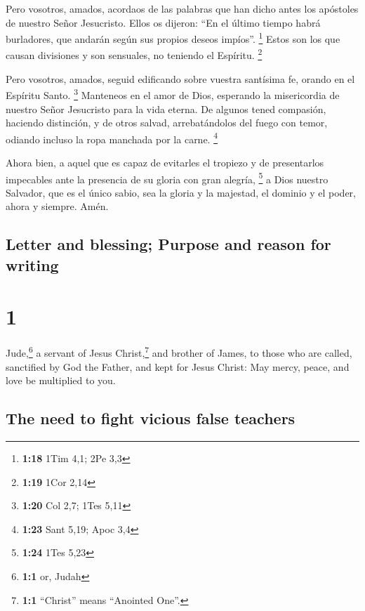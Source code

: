 \begin{paracol}{2}
 Pero vosotros, amados, acordaos de las palabras que han
dicho antes los apóstoles de nuestro Señor Jesucristo. 
Ellos os dijeron: ``En el último tiempo habrá burladores, que andarán
según sus propios deseos impíos''. \footnote{\textbf{1:18} 1Tim 4,1; 2Pe
  3,3}  Estos son los que causan divisiones y son
sensuales, no teniendo el Espíritu. \footnote{\textbf{1:19} 1Cor 2,14}

 Pero vosotros, amados, seguid edificando sobre vuestra
santísima fe, orando en el Espíritu Santo. \footnote{\textbf{1:20} Col
  2,7; 1Tes 5,11}  Manteneos en el amor de Dios,
esperando la misericordia de nuestro Señor Jesucristo para la vida
eterna.  De algunos tened compasión, haciendo distinción,
 y de otros salvad, arrebatándolos del fuego con temor,
odiando incluso la ropa manchada por la carne. \footnote{\textbf{1:23}
  Sant 5,19; Apoc 3,4}

 Ahora bien, a aquel que es capaz de evitarles el
tropiezo y de presentarlos impecables ante la presencia de su gloria con
gran alegría, \footnote{\textbf{1:24} 1Tes 5,23}  a Dios
nuestro Salvador, que es el único sabio, sea la gloria y la majestad, el
dominio y el poder, ahora y siempre. Amén. \switchcolumn
\begin{otherlanguage}{english}

\hypertarget{letter-and-blessing-purpose-and-reason-for-writing}{%
\subsection{Letter and blessing; Purpose and reason for
writing}\label{letter-and-blessing-purpose-and-reason-for-writing}}

\hypertarget{section-1}{%
\section{1}\label{section-1}}

 Jude,\footnote{\textbf{1:1} or, Judah} a servant of Jesus
Christ,\footnote{\textbf{1:1} ``Christ'' means ``Anointed One''.} and
brother of James, to those who are called, sanctified by God the Father,
and kept for Jesus Christ:  May mercy, peace, and love be
multiplied to you.

\hypertarget{the-need-to-fight-vicious-false-teachers}{%
\subsection{The need to fight vicious false
teachers}\label{the-need-to-fight-vicious-false-teachers}}


\end{otherlanguage}
\end{paracol}

